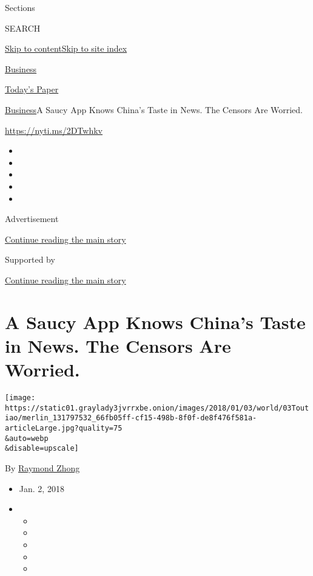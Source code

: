 Sections

SEARCH

\protect\hyperlink{site-content}{Skip to
content}\protect\hyperlink{site-index}{Skip to site index}

\href{https://www.nytimes3xbfgragh.onion/section/business}{Business}

\href{https://myaccount.nytimes3xbfgragh.onion/auth/login?response_type=cookie\&client_id=vi}{}

\href{https://www.nytimes3xbfgragh.onion/section/todayspaper}{Today's
Paper}

\href{/section/business}{Business}\textbar{}A Saucy App Knows China's
Taste in News. The Censors Are Worried.

\url{https://nyti.ms/2DTwhkv}

\begin{itemize}
\item
\item
\item
\item
\item
\end{itemize}

Advertisement

\protect\hyperlink{after-top}{Continue reading the main story}

Supported by

\protect\hyperlink{after-sponsor}{Continue reading the main story}

\hypertarget{a-saucy-app-knows-chinas-taste-in-news-the-censors-are-worried}{%
\section{A Saucy App Knows China's Taste in News. The Censors Are
Worried.}\label{a-saucy-app-knows-chinas-taste-in-news-the-censors-are-worried}}

\texttt{[image: https://static01.graylady3jvrrxbe.onion/images/2018/01/03/world/03Toutiao/merlin\_131797532\_66fb05ff-cf15-498b-8f0f-de8f476f581a-articleLarge.jpg?quality=75\\\&auto=webp\\\&disable=upscale]}

By \href{https://www.nytimes3xbfgragh.onion/by/raymond-zhong}{Raymond
Zhong}

\begin{itemize}
\item
  Jan. 2, 2018
\item
  \begin{itemize}
  \item
  \item
  \item
  \item
  \item
  \end{itemize}
\end{itemize}

